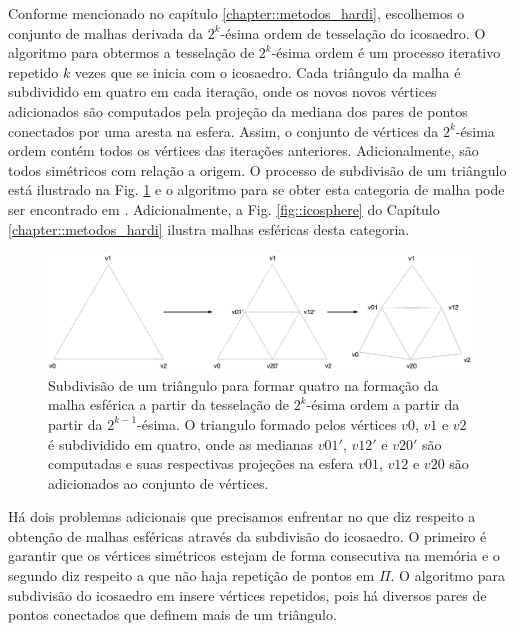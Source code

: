 \documentclass[
    12pt,                %
    oneside,            %
    a4paper,            %
    english,            %
    french,                %
    spanish,            %
    brazil                %
    ]{abntex2}
\begin{document}

Conforme mencionado no capítulo \ref{chapter::metodos_hardi}, escolhemos o conjunto de malhas derivada da $2^k$-ésima ordem de tesselação do icosaedro. O algoritmo para obtermos a tesselação de $2^k$-ésima ordem é um processo iterativo repetido $k$ vezes que se inicia com o icosaedro. Cada triângulo da malha é subdividido em quatro em cada iteração, onde os novos novos vértices adicionados são computados pela projeção da mediana dos pares de pontos conectados por uma aresta na esfera. Assim, o conjunto de vértices da $2^k$-ésima ordem contém todos os vértices das iterações anteriores. Adicionalmente, são todos simétricos com relação a origem. O processo de subdivisão de um triângulo está ilustrado na Fig. \ref{fig::triangle_icosahedron} e o algoritmo para se obter esta categoria de malha pode ser encontrado em . Adicionalmente, a Fig. \ref{fig::icosphere} do Capítulo \ref{chapter::metodos_hardi} ilustra malhas esféricas desta categoria.

\begin{figure}[htb]
    \centering
    \includegraphics[width=1.0\linewidth, angle=0]{figs/Esquema_Glifo/ico_subdivision.png}
    \caption{
    Subdivisão de um triângulo para formar quatro na formação da malha esférica a partir da tesselação de $2^k$-ésima ordem a partir da partir da $2^{k-1}$-ésima. O triangulo formado pelos vértices $v0$, $v1$ e $v2$ é subdividido em quatro, onde as medianas  $v01'$, $v12'$ e $v20'$ são computadas e suas respectivas projeções na esfera $v01$, $v12$ e $v20$ são adicionados ao conjunto de vértices.
    }
    \label{fig::triangle_icosahedron}
\end{figure}

Há dois problemas adicionais que precisamos enfrentar no que diz respeito a obtenção de malhas esféricas através da subdivisão do icosaedro. O primeiro é garantir que os vértices simétricos estejam de forma consecutiva na memória e o segundo diz respeito a que não haja repetição de pontos em $\Pi$. O algoritmo para subdivisão do icosaedro em  insere vértices repetidos, pois há diversos pares de pontos conectados que definem mais de um triângulo.
\end{document}
